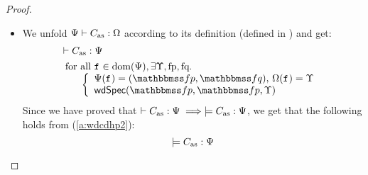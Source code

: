 \begin{proof}
\begin{itemize}
        \item We unfold ${\Psi{}} \vdash {C_{\text{as}}} : {\Omega}$ 
            according to its definition 
            (defined in \Fig{\ref{fig:Selected Inference Rules for Refinement Verification}}) 
            and get:
            \begin{align}
                & \wfcdhp{\asmimp}{\Cspec{}} \label{a:wdcdhp2} \\
                & \begin{array}{l}
                      \text{for all } \lab{} \in \dom(\Cspec{}), 
                      \exists \hprim, \specpre, \specpost. \\
                      \quad \ \
                      \left\{
                          \begin{array}{l}
                             \Cspec(\lab{}) = (\relspecpre, \relspecpost), \,
                             \hprimset(\lab{}) = \hprim \\
                             \wdSpec{\relspecpre}{\relspecpre}{\hprim}
                          \end{array}
                      \right.  
                  \end{array}
                  \label{a:wdspec}
            \end{align} 
            Since we have proved that 
            $\vdash {C_{\text{as}}} : {\Psi{}} \implies 
            \models C_{\text{as}}:\Psi{}$, we get that 
            the following holds from (\ref{a:wdcdhp2}):
            \begin{equation}
                \models C_{\text{as}}:\Psi{} 
                \label{a:semwdcdhp2}    
            \end{equation}


\end{itemize}
\end{proof}
